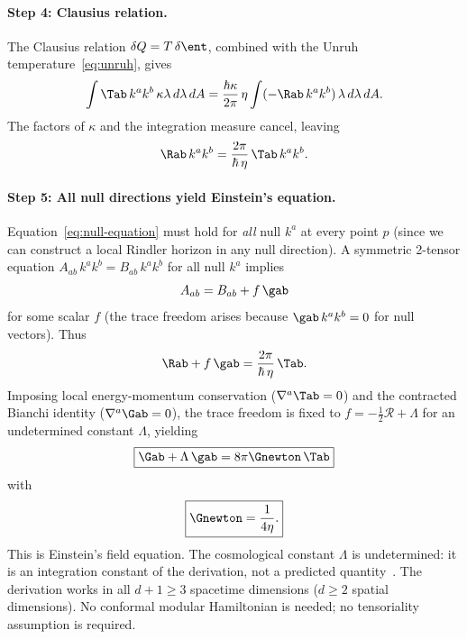 \paragraph{Step 4: Clausius relation.}
The Clausius relation $\delta Q = T\, \delta \ent$, combined with the
Unruh temperature~\eqref{eq:unruh}, gives
\begin{equation}
  \int \Tab\, k^a k^b\, \kappa\lambda\, d\lambda\, dA
  = \frac{\hbar\kappa}{2\pi}\, \eta
  \int (-\Rab\, k^a k^b)\, \lambda\, d\lambda\, dA.
  \label{eq:clausius}
\end{equation}
The factors of $\kappa$ and the integration measure cancel, leaving
\begin{equation}
  \Rab\, k^a k^b = \frac{2\pi}{\hbar\, \eta}\, \Tab\, k^a k^b.
  \label{eq:null-equation}
\end{equation}

\paragraph{Step 5: All null directions yield Einstein's equation.}
Equation~\eqref{eq:null-equation} must hold for \emph{all} null
$k^a$ at every point $p$ (since we can construct a local Rindler
horizon in any null direction).  A symmetric 2-tensor equation
$A_{ab}\, k^a k^b = B_{ab}\, k^a k^b$ for all null $k^a$ implies
\begin{equation}
  A_{ab} = B_{ab} + f\, \gab
\end{equation}
for some scalar $f$ (the trace freedom arises because
$\gab\, k^a k^b = 0$ for null vectors).  Thus
\begin{equation}
  \Rab + f\, \gab = \frac{2\pi}{\hbar\, \eta}\, \Tab.
  \label{eq:ricci-equation}
\end{equation}
Imposing local energy-momentum conservation
($\nabla^a \Tab = 0$) and the contracted Bianchi identity
($\nabla^a \Gab = 0$), the trace freedom is fixed to
$f = -\frac{1}{2}\mathcal{R} + \Lambda$ for an undetermined
constant $\Lambda$, yielding
\begin{equation}
  \boxed{\Gab + \Lambda\, \gab = 8\pi\Gnewton\, \Tab}
  \label{eq:einstein}
\end{equation}
with
\begin{equation}
  \boxed{\Gnewton = \frac{1}{4\eta}.}
  \label{eq:newton}
\end{equation}
This is Einstein's field equation.  The cosmological
constant $\Lambda$ is undetermined: it is an integration constant
of the derivation, not a predicted
quantity~\cite{Jacobson1995, JacobsonSperanza2019}.  The derivation
works in all $d + 1 \geq 3$ spacetime dimensions ($d \geq 2$ spatial
dimensions).  No conformal modular Hamiltonian is needed; no
tensoriality assumption is required.

